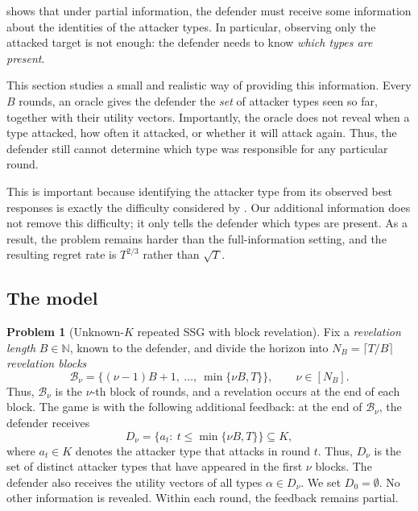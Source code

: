 \documentclass[letterpaper,9pt,twocolumn]{extarticle}
\newcommand{\NN}{\mathbb{N}}
\newcommand{\cB}{\mathcal{B}}
\theoremstyle{plain}
\theoremstyle{definition}
\newtheorem{problem}[theorem]{Problem}
\theoremstyle{remark}
\begin{document}
 shows that under partial information, the defender must
receive some information about the identities of the attacker types. In
particular, observing only the attacked target is not enough: the defender
needs to know \emph{which types are present}.

This section studies a small and realistic way of providing this information.
Every $B$ rounds, an oracle gives the defender the \emph{set} of attacker
types seen so far, together with their utility vectors. Importantly, the
oracle does not reveal when a type attacked, how often it attacked, or
whether it will attack again. Thus, the defender still cannot determine
which type was responsible for any particular round.

This is important because identifying the attacker type from its observed
best responses is exactly the difficulty considered by
\citet[Section 6]{balcan2015}. Our additional information does not remove
this difficulty; it only tells the defender which types are present. As a
result, the problem remains harder than the full-information setting, and
the resulting regret rate is $T^{2/3}$ rather than $\sqrt{T}$.

\subsection{The model}

\begin{problem}[Unknown-$K$ repeated SSG with block revelation]
\label{prob:block}
Fix a \emph{revelation length} $B\in\NN$, known to the defender, and divide
the horizon into $N_B=\lceil T/B\rceil$ \emph{revelation blocks}
\begin{equation}
\cB_\nu
=
\{(\nu-1)B+1,\ \dots,\ \min\{\nu B,T\}\},
\qquad \nu\in[N_B].
\label{eq:blocks}
\end{equation}
Thus, $\cB_\nu$ is the $\nu$-th block of rounds, and a revelation occurs
at the end of each block. The game is  with the following
additional feedback: at the end of $\cB_\nu$, the defender receives
\begin{equation}
D_\nu
=
\{a_t:\ t\le \min\{\nu B,T\}\}
\subseteq K,
\label{eq:Dnu}
\end{equation}
where $a_t\in K$ denotes the attacker type that attacks in round $t$.
Thus, $D_\nu$ is the set of distinct attacker types that have appeared in
the first $\nu$ blocks. The defender also receives the utility vectors of
all types $\alpha\in D_\nu$. We set $D_0=\emptyset$. No other information
is revealed. Within each
round, the feedback remains partial.
\end{problem}
\end{document}

